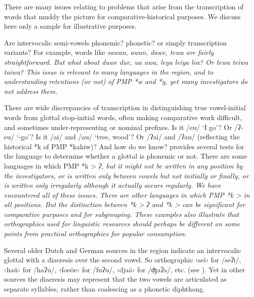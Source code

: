 There are many issues relating to problems that arise from the
transcription of words that muddy the picture for comparative-historical purposes.
We discuss here only a sample for illustrative purposes.

Are intervocalic semi-vowels phonemic? phonetic? or simply transcription
variants? For example, words like \it{sawan, awan,
dawe, tewa} are fairly straightforward.
But what about \it{duwe {\tl} due,
ua {\tl} uwa}, \it{leya {\tl} leiya {\tl} lea}? Or \it{tewa {\tl}
teiwa {\tl} taiwa}? This issue is relevant to many languages
in the region, and to understanding retentions (or not) of PMP *w
and *y, yet many investigators do not address them.

There are wide discrepancies of transcription in distinguishing
true vowel-initial words from glottal stop-initial words,
often making comparative work difficult,
and sometimes under-representing  or nominal prefixes.
Is it /eu/ ‘I go’? Or /ʔ-eu/ ‘-go’? Is it /ai/
and /au/ ‘tree, wood’? Or /ʔai/
and /ʔau/ (reflecting the historical *k of PMP *kahiw)?
And how do we know? \citet[60--62]{Tamelan2021} provides several tests
for the  language to determine whether a glottal is phonemic or not.
There are some languages in which PMP *k > \it{ʔ},
but it might not be written in any position by the investigators,
or is written only between vowels but not initially or finally,
or is written only irregularly although it actually occurs regularly.
We have encountered all of these issues.
There are other languages in which PMP *k > {\0} in all positions.
But the distinction between *k > \it{ʔ}
and *k > {\0} can be significant for comparative purposes and for subgrouping.
These examples also illustrate that orthographies used for linguistic
resources should perhaps be different on some points from practical
orthographies for popular consumption.

Several older Dutch and German sources in the region indicate
an intervocalic glottal with a diaeresis over the second vowel.
So orthographic ‹seï› for /seʔi/,
‹haü› for /haʔu/, ‹foeöe› for /fuʔu/,
‹djaä› for /ʤaʔa/, etc. (see \citealp{Grimes1999}).
Yet in other sources the diaeresis may represent that the
two vowels are articulated as separate syllables,
rather than coalescing as a phonetic diphthong.

